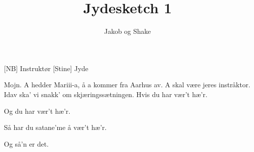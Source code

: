 \documentclass[a4paper,11pt]{article}
\title{Jydesketch 1}
\author{Jakob og Shake}
\begin{document}
\maketitle

\begin{roles}
[NB] Instruktør
[Stine] Jyde
\end{roles}



\begin{sketch}

 Mojn. A hedder Mariii-a, å a kommer fra Aarhus av. A skal være jeres instråktor. Idav ska’ vi snakk’ om skjæringssætningen. Hvis du har vær’t hæ’r.


 Og du har vær’t hæ’r.


 Så har du satane'me å vær’t hæ’r.


 Og så’n er det.
\end{sketch}
\end{document}
